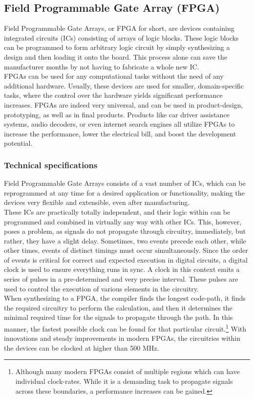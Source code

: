 \subsection{Field Programmable Gate Array (FPGA)}
Field Programmable Gate Arrays, or FPGA for short, are devices containing
integrated circuits (ICs) consisting of arrays of logic blocks.
These logic blocks can be programmed to form arbitrary logic circuit by simply
synthesizing a design and then loading it onto the board. This process alone
can save the manufacturer months by not having to fabricate a whole new IC. \\
FPGAs can be used for any computational tasks without the need of any additional
hardware. Usually, these devices are used for smaller, domain-specific tasks,
where the control over the hardware yields significant performance increases.
FPGAs are indeed very universal, and can be used in product-design, prototyping,
as well as in final products. Products like car driver assistance
systems\cite{xilinx_fpga_automotive}, audio decoders\cite{xilinx_fpga_audio},
or even internet search engines\cite{bing_search_fpga}  all utilize FPGAs to
increase the performance, lower the electrical bill, and  boost the development
potential.


\subsubsection{Technical specifications}
Field Programmable Gate Arrays consists of a vast number of ICs, which can
be reprogrammed at any time for a desired application or functionality\cite{ni_fpga},
making the devices very flexible and extensible, even after manufacturing.\\
These ICs are practically totally independent, and their logic within can be
programmed and combined in virtually any way with other ICs. This, however,
poses a problem, as signals do not propagate through circuitry, immediately, but
rather, they have a slight delay.
Sometimes, two events precede each other, while other times, events of distinct
timings must occur simultaneously.
Since the order of events is critical for correct and expected execution in
digital circuits, a digital clock is used to ensure everything runs in sync.
A clock in this context emits a series of pulses in a pre-determined and very
precise interval. These pulses are used to control the execution of various
elements in the circuitry.\\
When synthesizing to a FPGA, the compiler finds the longest code-path, it finds
the required circuitry to perform the calculation, and then it determines the
minimal required time for the signals to propagate through the path. In this
manner, the fastest possible clock can be found for that particular circuit.\footnote{
    Although many modern FPGAs consist of multiple regions which can have individual
    clock-rates. While it is a demanding task to propagate signals across these
    boundaries, a performance increases can be gained.
}
With innovations and steady improvements in modern FPGAs, the circuitries within
the devices can be clocked at higher than 500 MHz\cite{xilinx_fpga}.



